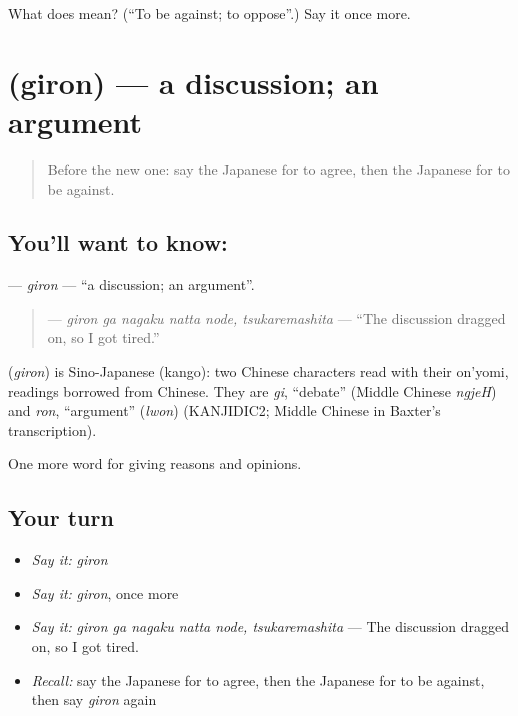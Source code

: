 \begin{tcolorbox}[breakable,colback=teal!4,colframe=teal!35!black,title={Before you move on}]
What does  mean? (\textquotedblleft{}To be against; to oppose\textquotedblright{}.) Say it once more.
\end{tcolorbox}
\section[\texorpdfstring{\ja{ぎろん} (giron)}{ぎろん (giron)}]{ (giron) — a discussion; an argument}

\label{lesson:JA-C317-giron}



\begin{quote}
Before the new one: say the Japanese for to agree, then the Japanese for to be against.
\end{quote}

\subsection*{You'll want to know: }
\textbf{} — \emph{giron} — \textquotedblleft{}a discussion; an argument\textquotedblright{}.

\begin{quote}
\textbf{  } — \emph{giron ga nagaku natta node, tsukaremashita} — \textquotedblleft{}The discussion dragged on, so I got tired.\textquotedblright{}
\end{quote}

\begin{cousinweb}
\textbf{} (\emph{giron}) is Sino-Japanese (kango): two Chinese characters read with their on'yomi, readings borrowed from Chinese. They are \emph{gi}, \textquotedblleft{}debate\textquotedblright{} (Middle Chinese \emph{ngjeH}) and \emph{ron}, \textquotedblleft{}argument\textquotedblright{} (\emph{lwon}) (KANJIDIC2; Middle Chinese in Baxter's transcription).
\end{cousinweb}

\begin{grammarlens}[title={What you've built}]
One more word for giving reasons and opinions.
\end{grammarlens}

\subsection*{Your turn}
\begin{itemize}
\raggedright
  \item \emph{Say it:} \emph{giron}
  \item \emph{Say it:} \emph{giron}, once more
  \item \emph{Say it:} \emph{giron ga nagaku natta node, tsukaremashita} — The discussion dragged on, so I got tired.
  \item \emph{Recall:} say the Japanese for to agree, then the Japanese for to be against, then say \emph{giron} again
\end{itemize}

